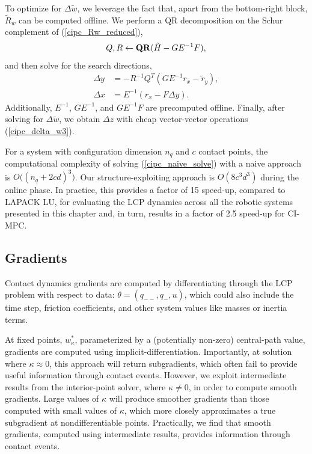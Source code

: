To optimize for $\Delta \tilde{w}$, we leverage the fact that, apart from the bottom-right block, $\tilde{R}_w$ can be computed offline. We perform a QR decomposition on the Schur complement of (\ref{cipc_Rw_reduced}), 
\begin{align}
	Q, R \leftarrow \mbox{\textbf{QR}}(\tilde{H} - G E^{-1} F),
\end{align}
and then solve for the search directions,
\begin{align}
	\Delta y &= - R^{-1} Q^T (G E^{-1} r_x - \tilde{r}_y), \\
	\Delta x & = E^{-1} (r_x - F \Delta y).
\end{align}
Additionally, $E^{-1}$, $G E^{-1}$, and $G E^{-1} F$ are precomputed offline. Finally, after solving for $\Delta \tilde{w}$, we obtain $\Delta z$ with cheap vector-vector operations (\ref{cipc_delta_w3}).

For a system with configuration dimension $n_q$ and $c$ contact points, the computational complexity of solving (\ref{cipc_naive_solve}) with a naive approach is $O\Big((n_q+2cd)^3 \Big)$. Our structure-exploiting approach is $O(8c^3d^3)$ during the online phase. In practice, this provides a factor of 15 speed-up, compared to LAPACK LU, for evaluating the LCP dynamics across all the robotic systems presented in this chapter and, in turn, results in a factor of 2.5 speed-up for CI-MPC.

\subsection{Gradients}
Contact dynamics gradients are computed by differentiating through the LCP problem with respect to data: $\theta = (q_{--}, q_{-}, u)$, which could also include the time step, friction coefficients, and other system values like masses or inertia terms. 

At fixed points, $w^*_{\kappa}$, parameterized by a (potentially non-zero) central-path value, gradients are computed using implicit-differentiation. Importantly, at solution where $\kappa \approx 0$, this approach will return subgradients, which often fail to provide useful information through contact events. However, we exploit intermediate results from the interior-point solver, where $\kappa \neq 0$, in order to compute smooth gradients. Large values of $\kappa$ will produce smoother gradients than those computed with small values of $\kappa$, which more closely approximates a true subgradient at nondifferentiable points. Practically, we find that smooth gradients, computed using intermediate results, provides information through contact events.

